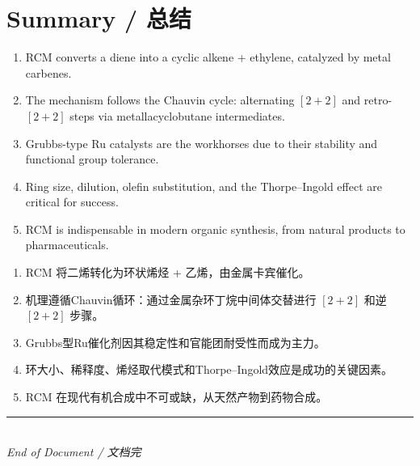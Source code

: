 \documentclass[11pt, a4paper]{article}
\begin{document}
\section{Summary / 总结}

\begin{enbox}
\begin{enumerate}[nosep]
  \item RCM converts a diene into a cyclic alkene + ethylene, catalyzed by metal carbenes.
  \item The mechanism follows the Chauvin cycle: alternating $[2+2]$ and retro-$[2+2]$ steps via metallacyclobutane intermediates.
  \item Grubbs-type Ru catalysts are the workhorses due to their stability and functional group tolerance.
  \item Ring size, dilution, olefin substitution, and the Thorpe--Ingold effect are critical for success.
  \item RCM is indispensable in modern organic synthesis, from natural products to pharmaceuticals.
\end{enumerate}
\end{enbox}

\begin{cnbox}[中文 --- 核心要点]
\begin{enumerate}[nosep]
  \item RCM 将二烯转化为环状烯烃 + 乙烯，由金属卡宾催化。
  \item 机理遵循Chauvin循环：通过金属杂环丁烷中间体交替进行 $[2+2]$ 和逆 $[2+2]$ 步骤。
  \item Grubbs型Ru催化剂因其稳定性和官能团耐受性而成为主力。
  \item 环大小、稀释度、烯烃取代模式和Thorpe--Ingold效应是成功的关键因素。
  \item RCM 在现代有机合成中不可或缺，从天然产物到药物合成。
\end{enumerate}
\end{cnbox}

\vfill
\begin{center}
\textcolor{accentblue}{\rule{0.6\textwidth}{0.5pt}}\\[6pt]
\small\textit{End of Document / 文档完}
\end{center}
\end{document}
